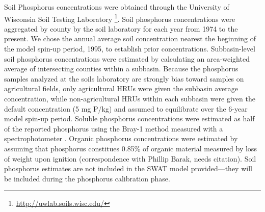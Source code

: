 Soil Phosphorus concentrations were obtained through the University of Wisconsin
Soil Testing Laboratory \footnote{\url{http://uwlab.soils.wisc.edu/}}. Soil
phosphorus concentrations were aggregated by county by the soil laboratory for
each year from 1974 to the present. We chose the annual average soil
concentration nearest the beginning of the model spin-up period, 1995, to
establish prior concentrations. Subbasin-level soil phosphorus concentrations
were estimated by calculating an area-weighted average of intersecting counties
within a subbasin.
Because the phosphorus samples analyzed at the soils laboratory are strongly
bias toward samples on agricultural fields, only agricultural HRUs were given
the subbasin average concentration, while non-agricultural HRUs within each
subbasin were given the default concentration (5 mg P/kg) and assumed to
equilibrate over the 6-year model spin-up period. Soluble phosphorus
concentrations were estimated as half of the reported phosphorus using the
Bray-1 method measured with a spectrophotometer \citep{vadas_validating_2010}.
Organic phosphorus concentrations were estimated by assuming that phosphorus
constitues 0.85\% of organic material measured by loss of weight upon ignition
(correspondence with Phillip Barak, needs citation). Soil phosphorus estimates are not included in the SWAT model provided---they will be included during the phosphorus calibration phase.
